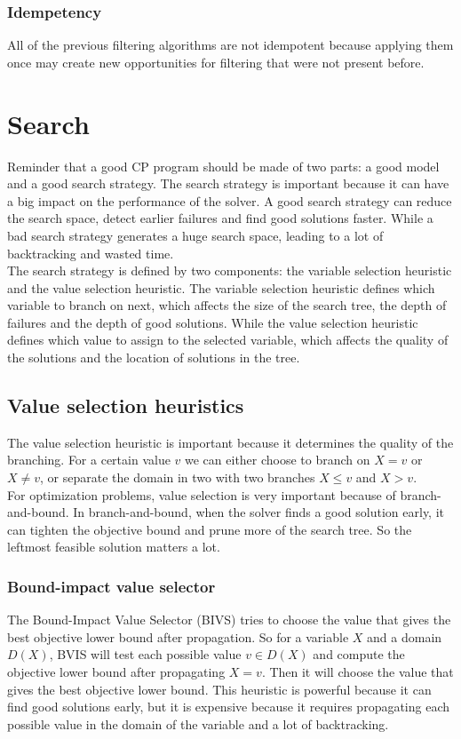 \documentclass[12pt, openany]{report}
\theoremstyle{definition}
\begin{document}
\subsection{Idempetency}
All of the previous filtering algorithms are not idempotent because applying them once may create new opportunities for filtering that were not present before. 
\chapter{Search}
Reminder that a good CP program should be made of two parts: a good model and a good search strategy. The search strategy is important because it can have a big impact on the performance of the solver. A good search strategy can reduce the search space, detect earlier failures and find good solutions faster. While a bad search strategy generates a huge search space, leading to a lot of backtracking and wasted time.\\
The search strategy is defined by two components: the variable selection heuristic and the value selection heuristic. The variable selection heuristic defines which variable to branch on next, which affects the size of the search tree, the depth of failures and the depth of good solutions. While the value selection heuristic defines which value to assign to the selected variable, which affects the quality of the solutions and the location of solutions in the tree.
\section{Value selection heuristics}
The value selection heuristic is important because it determines the quality of the branching. For a certain value $v$ we can either choose to branch on $X = v$ or $X \neq v$, or separate the domain in two with two branches $X \leq v$ and $X > v$.\\ 
For optimization problems, value selection is very important because of branch-and-bound. In branch-and-bound, when the solver finds a good solution early, it can tighten the objective bound and prune more of the search tree. So the leftmost feasible solution matters a lot.
\subsection{Bound-impact value selector}
The Bound-Impact Value Selector (BIVS) tries to choose the value that gives the best objective lower bound after propagation. So for a variable $X$ and a domain $D(X)$, BVIS will test each possible value $v \in D(X)$ and compute the objective lower bound after propagating $X = v$. Then it will choose the value that gives the best objective lower bound. This heuristic is powerful because it can find good solutions early, but it is expensive because it requires propagating each possible value in the domain of the variable and a lot of backtracking.
\end{document}
